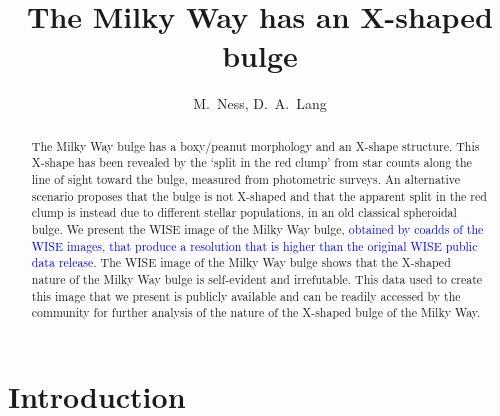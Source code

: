 \documentclass[12pt, preprint]{aastex}
\begin{document}
\title{The Milky Way has an X-shaped bulge} 
\author{%
M.~Ness,
D.~A.~Lang
}
%

\begin{abstract}%
The Milky Way bulge has a boxy/peanut morphology and an X-shape structure. This X-shape has been revealed by the `split in the red clump' from 
star counts along the line of sight toward the bulge, measured from photometric surveys. An alternative scenario proposes that the bulge is not X-shaped and that the apparent split in the red clump is instead due to different stellar populations, in an old classical spheroidal bulge. We present the WISE image of the Milky Way bulge, \textcolor{blue}{obtained by coadds of the WISE images, that produce a resolution that is higher than the original WISE public data release. }The WISE image of the Milky Way bulge shows that the X-shaped nature of the Milky Way bulge is self-evident and irrefutable. This data used to create this image that we present is publicly available and can be readily accessed by the community for further analysis of the nature of the X-shaped bulge of the Milky Way. 
\end{abstract}

\keywords{%
}

\section{Introduction}\label{sec:Intro}
\end{document}
